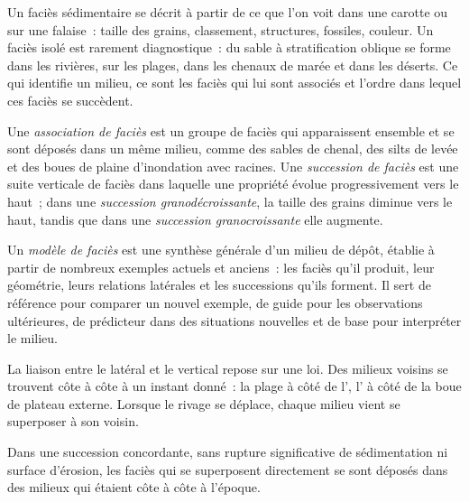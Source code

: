 Un faciès sédimentaire se décrit à partir de ce que l'on voit dans une carotte ou sur une
falaise~: taille des grains, classement, structures, fossiles, couleur. Un faciès isolé est
rarement diagnostique~: du sable à stratification oblique se forme dans les rivières, sur les
plages, dans les chenaux de marée et dans les déserts. Ce qui identifie un milieu, ce sont les
faciès qui lui sont associés et l'ordre dans lequel ces faciès se succèdent.

\begin{definition}\label{def:b3:facies-models:association}
Une \emph{association de faciès} est un groupe de faciès
qui apparaissent ensemble et se sont déposés dans un même milieu, comme des sables de chenal,
des silts de levée et des boues de plaine d'inondation avec racines. Une \emph{succession de
faciès} est une suite verticale de faciès dans laquelle une
propriété évolue progressivement vers le haut~; dans une \emph{succession
granodécroissante}, la taille des grains diminue vers le haut,
tandis que dans une \emph{succession granocroissante}
elle augmente.
\end{definition}

\begin{definition}\label{def:b3:facies-models:model}
Un \emph{modèle de faciès} est une synthèse générale
d'un milieu de dépôt, établie à partir de nombreux exemples actuels et anciens~: les faciès
qu'il produit, leur géométrie, leurs relations latérales et les successions qu'ils forment.
Il sert de référence pour comparer un nouvel exemple, de guide pour les observations
ultérieures, de prédicteur dans des situations nouvelles et de base
pour interpréter le milieu.
\end{definition}

La liaison entre le latéral et le vertical repose sur une loi. Des milieux voisins se trouvent
côte à côte à un instant donné~: la plage à côté de l', l' à côté de la
boue de plateau externe. Lorsque le rivage se déplace, chaque milieu vient se superposer
à son voisin.

\begin{theorem}\label{thm:b3:facies-models:walther}
Dans une succession concordante, sans rupture significative de sédimentation ni surface
d'érosion, les faciès qui se superposent directement se sont déposés dans des milieux qui
étaient côte à côte à l'époque.
\end{theorem}

